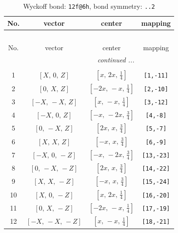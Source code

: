\documentclass[fleqn,8pt]{jsarticle}
\begin{document}
\renewcommand{\arraystretch}{1.2}
\begin{longtable}{cccc}
\caption{Wyckoff bond: {\tt 12f@6h}, bond symmetry: {\tt ..2}}
 \\
 \hline \hline
No. & vector & center & mapping \\ \hline \endfirsthead

\multicolumn{3}{l}{\tablename\ \thetable{}} \\
 \hline \hline
No. & vector & center & mapping \\ \hline \endhead

 \hline \hline
\multicolumn{3}{r}{\footnotesize\it continued ...} \\ \endfoot

 \hline \hline
\multicolumn{3}{r}{} \\ \endlastfoot

1 & $\left[ X,\, 0,\, Z \right]$ & $\left[ x,\, 2 x,\, \frac{1}{4} \right]$ & {\tt [1,-11]} \\ \hline
2 & $\left[ 0,\, X,\, Z \right]$ & $\left[ - 2 x,\, - x,\, \frac{1}{4} \right]$ & {\tt [2,-10]} \\ \hline
3 & $\left[ - X,\, - X,\, Z \right]$ & $\left[ x,\, - x,\, \frac{1}{4} \right]$ & {\tt [3,-12]} \\ \hline
4 & $\left[ - X,\, 0,\, Z \right]$ & $\left[ - x,\, - 2 x,\, \frac{3}{4} \right]$ & {\tt [4,-8]} \\ \hline
5 & $\left[ 0,\, - X,\, Z \right]$ & $\left[ 2 x,\, x,\, \frac{3}{4} \right]$ & {\tt [5,-7]} \\ \hline
6 & $\left[ X,\, X,\, Z \right]$ & $\left[ - x,\, x,\, \frac{3}{4} \right]$ & {\tt [6,-9]} \\ \hline
7 & $\left[ - X,\, 0,\, - Z \right]$ & $\left[ - x,\, - 2 x,\, \frac{3}{4} \right]$ & {\tt [13,-23]} \\ \hline
8 & $\left[ 0,\, - X,\, - Z \right]$ & $\left[ 2 x,\, x,\, \frac{3}{4} \right]$ & {\tt [14,-22]} \\ \hline
9 & $\left[ X,\, X,\, - Z \right]$ & $\left[ - x,\, x,\, \frac{3}{4} \right]$ & {\tt [15,-24]} \\ \hline
10 & $\left[ X,\, 0,\, - Z \right]$ & $\left[ x,\, 2 x,\, \frac{1}{4} \right]$ & {\tt [16,-20]} \\ \hline
11 & $\left[ 0,\, X,\, - Z \right]$ & $\left[ - 2 x,\, - x,\, \frac{1}{4} \right]$ & {\tt [17,-19]} \\ \hline
12 & $\left[ - X,\, - X,\, - Z \right]$ & $\left[ x,\, - x,\, \frac{1}{4} \right]$ & {\tt [18,-21]} \\
\end{longtable}
\end{document}
